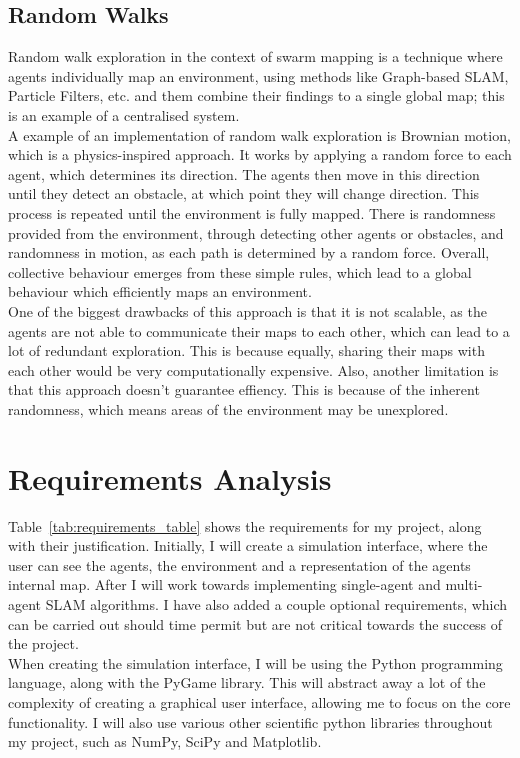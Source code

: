 \documentclass[12pt]{article}
\begin{document}
\subsection{Random Walks}
Random walk exploration in the context of swarm mapping is a technique where agents individually map an environment, using
methods like Graph-based SLAM, Particle Filters, etc. and them combine their findings to a single global map; this is an
example of a centralised system.\\
A example of an implementation of random walk exploration is Brownian motion, which is a physics-inspired
approach. It works by applying a random force to each agent, which determines its direction. The agents then move in this
direction until they detect an obstacle, at which point they will change direction. This process is repeated until the
environment is fully mapped. There is randomness provided from the environment, through detecting other agents or obstacles,
and randomness in motion, as each path is determined by a random force. Overall, collective behaviour emerges from these simple
rules, which lead to a global behaviour which efficiently maps an environment.\\
One of the biggest drawbacks of this approach is that it is not scalable, as the agents are not able to communicate their
maps to each other, which can lead to a lot of redundant exploration. This is because equally, sharing their maps with each
other would be very computationally expensive. Also, another limitation is that this approach doesn't guarantee effiency.
This is because of the inherent randomness, which means areas of the environment may be unexplored.\\


\section{Requirements Analysis}
Table~\ref{tab:requirements_table} shows the requirements for my project, along with their justification. Initially, I will
create a simulation interface, where the user can see the agents, the environment and a representation of the agents internal
map. After I will work towards implementing single-agent and multi-agent SLAM algorithms. I have also added a couple optional
requirements, which can be carried out should time permit but are not critical towards the success of the project.\\
When creating the simulation interface, I will be using the Python programming language, along with the PyGame library. This
will abstract away a lot of the complexity of creating a graphical user interface, allowing me to focus on the core functionality.
I will also use various other scientific python libraries throughout my project, such as NumPy, SciPy and Matplotlib.\\
\end{document}
